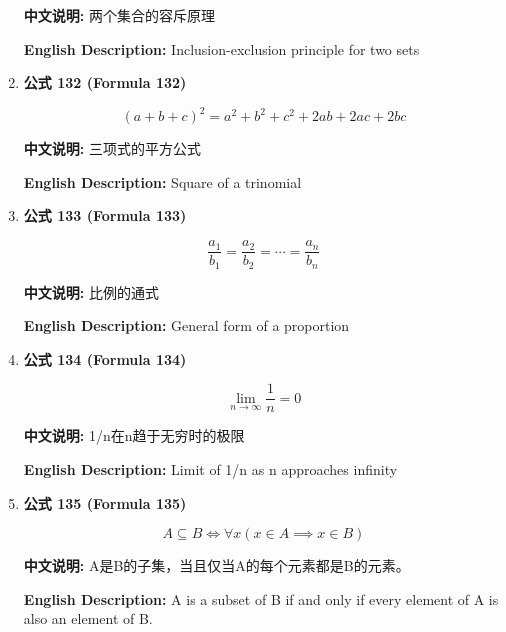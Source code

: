 \documentclass[12pt,a4paper]{article}
\begin{document}
\begin{enumerate}[leftmargin=*]
\textbf{中文说明:} 两个集合的容斥原理

\textbf{English Description:} Inclusion-exclusion principle for two sets

\vspace{0.5cm}

\item \textbf{公式 132 (Formula 132)}

\begin{equation}
(a+b+c)^2 = a^2 + b^2 + c^2 + 2ab + 2ac + 2bc
\end{equation}

\textbf{中文说明:} 三项式的平方公式

\textbf{English Description:} Square of a trinomial

\vspace{0.5cm}

\item \textbf{公式 133 (Formula 133)}

\begin{equation}
\frac{a_1}{b_1} = \frac{a_2}{b_2} = \cdots = \frac{a_n}{b_n}
\end{equation}

\textbf{中文说明:} 比例的通式

\textbf{English Description:} General form of a proportion

\vspace{0.5cm}

\item \textbf{公式 134 (Formula 134)}

\begin{equation}
\lim_{n \to \infty} \frac{1}{n} = 0
\end{equation}

\textbf{中文说明:} 1/n在n趋于无穷时的极限

\textbf{English Description:} Limit of 1/n as n approaches infinity

\vspace{0.5cm}

\item \textbf{公式 135 (Formula 135)}

\begin{equation}
A \subseteq B \iff \forall x (x \in A \implies x \in B)
\end{equation}

\textbf{中文说明:} A是B的子集，当且仅当A的每个元素都是B的元素。

\textbf{English Description:} A is a subset of B if and only if every element of A is also an element of B.


\end{enumerate}
\end{document}
